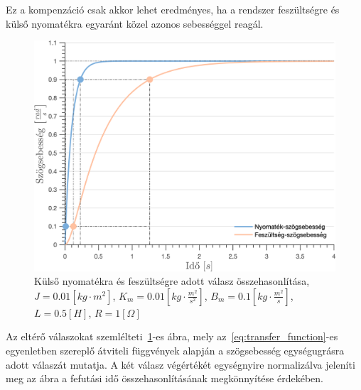 


Ez a kompenzáció
csak akkor lehet eredményes, ha a rendszer feszültségre és külső nyomatékra 
egyaránt közel azonos sebességgel reagál.
\begin{figure}[ht]
    \begin{center}
    \includegraphics[width=\textwidth]{images/step_response.png}
    \caption{Külső nyomatékra és feszültségre adott válasz összehasonlítása, 
    $J = 0.01 \left[kg\cdot m^2\right]$,
    $K_m = 0.01 \left[kg\cdot \frac{m^2}{s^2}\right]$,
    $B_m = 0.1 \left[kg\cdot \frac{m^2}{s}\right]$,
    $L = 0.5 \left[H\right]$,
    $R = 1 \left[\Omega\right]$}\label{fig:step_response}
    \end{center}
\end{figure}
Az eltérő válaszokat 
szemlélteti~\ref{fig:step_response}-es ábra, mely az~\eqref{eq:transfer_function}-es
egyenletben szereplő átviteli függvények alapján a szögsebesség egységugrásra adott válaszát mutatja. 
A két válasz végértékét egységnyire normalizálva jeleníti meg az ábra a fefutási idő 
összehasonlításának megkönnyítése érdekében. 



